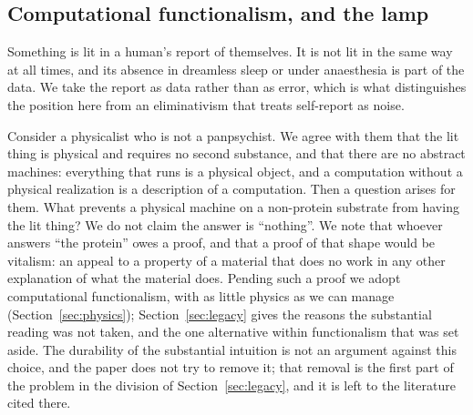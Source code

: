 \subsection{Computational functionalism, and the lamp}
\label{sec:lamp}

Something is lit in a human's report of themselves. It is not lit in the same way at all times, and its
absence in dreamless sleep or under anaesthesia is part of the data. We take the report as data rather
than as error, which is what distinguishes the position here from an eliminativism that treats
self-report as noise.

Consider a physicalist who is not a panpsychist. We agree with them that the lit thing is physical and
requires no second substance, and that there are no abstract machines: everything that runs is a
physical object, and a computation without a physical realization is a description of a computation.
Then a question arises for them. What prevents a physical machine on a non-protein substrate from
having the lit thing? We do not claim the answer is ``nothing''. We note that whoever answers ``the
protein'' owes a proof, and that a proof of that shape would be vitalism: an appeal to a property of a
material that does no work in any other explanation of what the material does. Pending such a proof we
adopt computational functionalism, with as little physics as we can manage
(Section~\ref{sec:physics}); Section~\ref{sec:legacy} gives the reasons the substantial reading was
not taken, and the one alternative within functionalism that was set aside. The durability of the
substantial intuition is not an argument against this choice, and the paper does not try to remove
it; that removal is the first part of the problem in the division of Section~\ref{sec:legacy}, and
it is left to the literature cited there.

